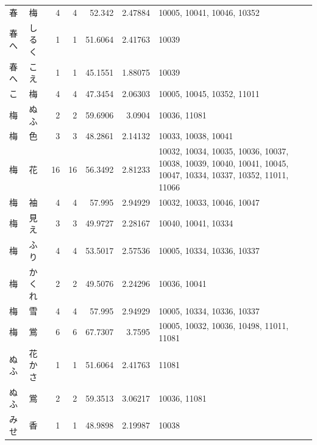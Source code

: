 \begin{tabular}{llrrrrl}
春 & 梅 & 4 & 4 & 52.342 & 2.47884 & 10005, 10041, 10046, 10352 \\
春へ & しるく & 1 & 1 & 51.6064 & 2.41763 & 10039 \\
春へ & こえ & 1 & 1 & 45.1551 & 1.88075 & 10039 \\
こ & 梅 & 4 & 4 & 47.3454 & 2.06303 & 10005, 10045, 10352, 11011 \\
梅 & ぬふ & 2 & 2 & 59.6906 & 3.0904 & 10036, 11081 \\
梅 & 色 & 3 & 3 & 48.2861 & 2.14132 & 10033, 10038, 10041 \\
梅 & 花 & 16 & 16 & 56.3492 & 2.81233 & 10032, 10034, 10035, 10036, 10037, 10038, 10039, 10040, 10041, 10045, 10047, 10334, 10337, 10352, 11011, 11066 \\
梅 & 袖 & 4 & 4 & 57.995 & 2.94929 & 10032, 10033, 10046, 10047 \\
梅 & 見え & 3 & 3 & 49.9727 & 2.28167 & 10040, 10041, 10334 \\
梅 & ふり & 4 & 4 & 53.5017 & 2.57536 & 10005, 10334, 10336, 10337 \\
梅 & かくれ & 2 & 2 & 49.5076 & 2.24296 & 10036, 10041 \\
梅 & 雪 & 4 & 4 & 57.995 & 2.94929 & 10005, 10334, 10336, 10337 \\
梅 & 鴬 & 6 & 6 & 67.7307 & 3.7595 & 10005, 10032, 10036, 10498, 11011, 11081 \\
ぬふ & 花かさ & 1 & 1 & 51.6064 & 2.41763 & 11081 \\
ぬふ & 鴬 & 2 & 2 & 59.3513 & 3.06217 & 10036, 11081 \\
みせ & 香 & 1 & 1 & 48.9898 & 2.19987 & 10038 \\
\hline
\end{tabular}
